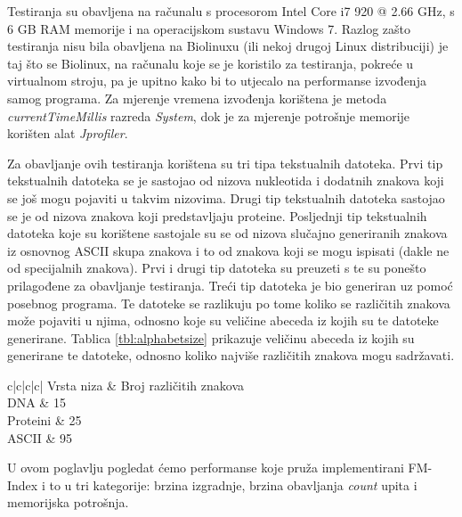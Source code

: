 Testiranja su obavljena na računalu s procesorom Intel Core i7 920 @ 2.66 GHz, s 6 GB RAM memorije i na operacijskom sustavu Windows 7. Razlog zašto testiranja nisu bila obavljena na Biolinuxu (ili nekoj drugoj Linux distribuciji) je taj što se Biolinux, na računalu koje se je koristilo za testiranja, pokreće u virtualnom stroju, pa je upitno kako bi to utjecalo na performanse izvođenja samog programa. Za mjerenje vremena izvođenja korištena je metoda \textit{currentTimeMillis} razreda \textit{System}, dok je za mjerenje potrošnje memorije korišten alat \textit{Jprofiler}.

Za obavljanje ovih testiranja korištena su tri tipa tekstualnih datoteka. Prvi tip tekstualnih datoteka se je sastojao od nizova nukleotida i dodatnih znakova koji se još mogu pojaviti u takvim nizovima. Drugi tip tekstualnih datoteka sastojao se je od nizova znakova koji predstavljaju proteine. Posljednji tip tekstualnih datoteka koje su korištene sastojale su se od nizova slučajno generiranih znakova iz osnovnog ASCII skupa znakova i to od znakova koji se mogu ispisati (dakle ne od specijalnih znakova). Prvi i drugi tip datoteka su preuzeti s \cite{corpus} te su ponešto prilagođene za obavljanje testiranja. Treći tip datoteka je bio generiran uz pomoć posebnog programa. Te datoteke se razlikuju po tome koliko se različitih znakova može pojaviti u njima, odnosno koje su veličine abeceda iz kojih su te datoteke generirane. Tablica \ref{tbl:alphabetsize} prikazuje veličinu abeceda iz kojih su generirane te datoteke, odnosno koliko najviše različitih znakova mogu sadržavati. 

\begin{table}[h]
\caption{Maksimalna veličina abecede pojedinih datoteka}
\label{tbl:alphabetsize}
\centering\begin{tabular}{c|c|c|c|}
 \hline
{} {Vrsta niza} & Broj različitih znakova   \\ \hline
{} {   DNA   }		&	15		\\ \hline
{} {   Proteini   }	&	25		\\ \hline
{} {   ASCII   }	&	95		\\ \hline
\end{tabular}
\end{table}


U ovom poglavlju pogledat ćemo performanse koje pruža implementirani FM-Index i to u tri kategorije: brzina izgradnje, brzina obavljanja \textit{count} upita i memorijska potrošnja.

